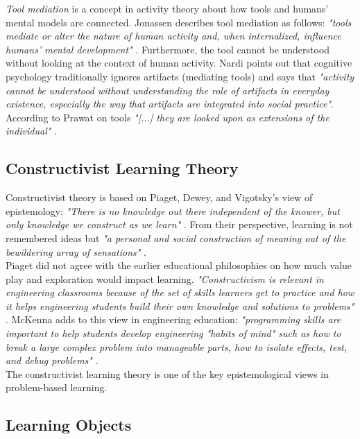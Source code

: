 \noindent
\textit{Tool mediation} is a concept in activity theory about how tools and humans' mental models are connected. Jonassen describes tool mediation as follows: \textit{"tools mediate or alter the nature of human activity and, when internalized, influence humans' mental development"} \cite[p. 66-67]{jonassen1999activitytheory}. Furthermore, the tool cannot be understood without looking at the context of human activity. Nardi \cite[p. 66]{jonassen1999activitytheory} points out that cognitive psychology traditionally ignores artifacts (mediating tools) and says that \textit{"activity cannot be understood without understanding the role of artifacts in everyday existence, especially the way that artifacts are integrated into social practice"}. According to Prawat on tools \textit{"[...] they are looked upon as extensions of the individual"} \cite[p. 39]{postholm2008activitytheory}.


\subsection*{Constructivist Learning Theory}
Constructivist theory is based on Piaget, Dewey, and Vigotsky's view of epistemology: \textit{"There is no knowledge out there independent of the knower, but only knowledge we construct as we learn"} \cite[p. 1]{hein1991constructivist}. From their perspective, learning is not remembered ideas but \textit{"a personal and social construction of meaning out of the bewildering array of sensations"} \cite[p. 1-2]{hein1991constructivist}. \\

\noindent
Piaget did not agree with the earlier educational philosophies on how much value play and exploration would impact learning.
\textit{"Constructivism is relevant in engineering classrooms because of the set of skills learners get to practice and how it helps engineering students build their own knowledge and solutions to problems"} \cite[p. 144]{nino2015constructivist}. McKenna adds to this view in engineering education: \textit{"programming skills are important to help students develop engineering "habits of mind" such as how to break a large complex problem into manageable parts, how to isolate effects, test, and debug problems"} \cite[p. 1]{mckenna2005constructivist}. \\

\noindent
The constructivist learning theory is one of the key epistemological views in problem-based learning.


\subsection*{Learning Objects}

